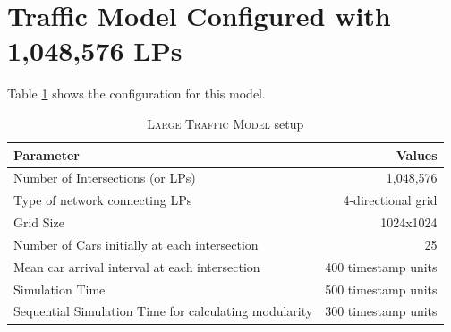 \documentclass[11pt]{book}
\begin{document}
\clearpage
\section[\textsc{traffic-1m lp}s]{Traffic Model Configured with 1,048,576 LPs}

Table \ref{table:traffic_1m_config} shows the configuration for this model.

\begin{table}
    \centering
    \begin{tabular}{|| l | r ||}
        \hline
        Parameter                           &   Values\\ [0.5ex]
        \hline\hline
        Number of Intersections (or LPs)    &   1,048,576\\
        Type of network connecting LPs      &   4-directional grid\\
        Grid Size                           &   1024x1024\\
        Number of Cars initially at each intersection   &   25\\
        Mean car arrival interval at each intersection  &   400 timestamp units\\
        Simulation Time                     &   500 timestamp units\\
        Sequential Simulation Time for calculating modularity   &   300 timestamp units\\
        \hline
    \end{tabular}
    \caption{\textsc{Large Traffic Model} setup}\label{table:traffic_1m_config}
\end{table}
\end{document}
